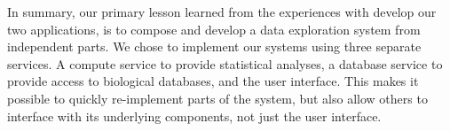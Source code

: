 In summary, our primary lesson learned from the experiences with develop our two
applications, is to compose and develop a data exploration system from
independent parts.  We chose to implement our systems using three separate
services. A compute service to provide statistical analyses, a database service
to provide access to biological databases, and the user interface. This makes it
possible to quickly re-implement parts of the system, but also allow others to
interface with its underlying components, not just the user interface. 
